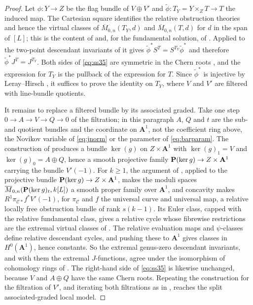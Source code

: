 \begin{proof}
  Let \(\phi\colon Y\to Z\) be the flag bundle of \(V\oplus V'\) and
  \(\tilde\phi\colon T_{Y}=Y\times_{Z}T\to T\) the induced map.  The
  Cartesian square identifies the relative obstruction theories and hence
  the virtual classes of \(\overline M_{0,n}(T_{Y},d)\) and
  \(\overline M_{0,n}(T,d)\) for \(d\) in the span of \([L]\); this is the
  content of \cite[Theorem~4.2]{SS} and, for the fundamental solution, of
  \cite[Lemma~9.5]{SS}.  Applied to the two-point descendant invariants of
  \cite[(18)]{SS} it gives \(\tilde\phi^{*}S^{T}=S^{T_{Y}}\tilde\phi^{*}\)
  and therefore \(\tilde\phi^{*}J^{T}=J^{T_{Y}}\).  Both sides of
  \eqref{eq:ss35} are symmetric in the Chern roots
  \cite[Remark~4.5(2)]{SS}, and the expression for \(T_{Y}\) is the pullback
  of the expression for \(T\).  Since \(\tilde\phi^{*}\) is injective by
  Leray--Hirsch \cite[Corollary~4.3]{SS}, it suffices to prove the identity
  on \(T_{Y}\), where \(V\) and \(V'\) are filtered with line-bundle
  quotients.

  It remains to replace a filtered bundle by its associated graded.  Take one
  step \(0\to A\to V\to Q\to0\) of the filtration; in this paragraph \(A\),
  \(Q\) and \(t\) are the sub- and quotient bundles and the coordinate on
  \(\mathbf A^{1}\), not the coefficient ring above, the Novikov variable of
  \eqref{eq:jnorm} or the parameter of \eqref{eq:barparam}.  The construction of
  \cite[Lemma~9.4]{SS} produces a bundle \(\ker(g)\) on \(Z\times\mathbf
  A^{1}\) with \(\ker(g)_{1}=V\) and \(\ker(g)_{0}=A\oplus Q\), hence a
  smooth projective family \(\mathbf P(\ker g)\to Z\times\mathbf A^{1}\) carrying
  the bundle \(V'(-1)\).  For \(k\ge1\), the argument of
  \cite[Proposition~3.1]{SS}, applied to the projective bundle
  \(\mathbf P(\ker g)\to Z\times\mathbf A^{1}\), makes the moduli spaces
  \(\overline M_{0,n}(\mathbf P(\ker g)_{t},k[L])\) a smooth proper family
  over \(\mathbf A^{1}\), and concavity makes
  \(R^{1}\pi_{\mathcal C*}f^{*}V'(-1)\), for \(\pi_{\mathcal C}\) and \(f\)
  the universal curve and universal map, a relative locally free obstruction
  bundle of rank \(s(k-1)\).  Its Euler class, capped with the relative
  fundamental class, gives a relative cycle whose fibrewise restrictions
  are the extremal virtual classes of \cite[Corollary~3.2]{SS}.  The relative
  evaluation maps and \(\psi\)-classes define relative descendant cycles, and
  pushing these to \(\mathbf A^{1}\) gives classes in
  \(H^{0}(\mathbf A^{1})\), hence constants.  So the extremal genus-zero
  descendant invariants, and with them the extremal
  \(J\)-functions, agree under the isomorphism of cohomology rings of
  \cite[Lemma~9.4]{SS}.  The right-hand side of \eqref{eq:ss35} is likewise
  unchanged, because \(V\) and \(A\oplus Q\) have the same Chern roots.
  Repeating the construction for the filtration of \(V'\), and iterating both
  filtrations as in \cite[Lemma~9.6]{SS}, reaches the split
  associated-graded local model.
\end{proof}

